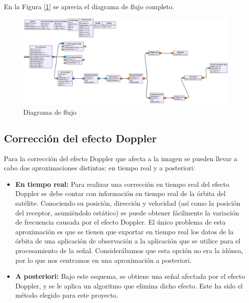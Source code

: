 \documentclass[a4paper,openright,12pt]{article}
\begin{document}
	 En la Figura [\ref{diagrama_completo}] se aprecia el diagrama de flujo completo.
	
	\begin{figure}[hbtp]
 \centering
 \includegraphics[width = 1 \linewidth]{imagenes/diagrama_flujo_completo.JPG}
 \caption{Diagrama de flujo}
 \label{diagrama_completo}
 \end{figure}

\newpage


	\subsection{Corrección del efecto Doppler}

	Para la corrección del efecto Doppler que afecta a la imagen se pueden llevar a cabo dos aproximaciones distintas: en tiempo real y a posteriori:
	
	\begin{itemize}
	
	\item \textbf{En tiempo real:} Para realizar una corrección en tiempo real del efecto Doppler se debe contar con información en tiempo real de la órbita del satélite. Conociendo su posición, dirección y velocidad (así como la posición del receptor, asumiéndolo estático) se puede obtener fácilmente la variación de frecuencia causada por el efecto Doppler. El único problema de esta aproximación es que se tienen que exportar en tiempo real los datos de la órbita de una aplicación de observación a la aplicación que se utilice para el procesamiento de la señal. Considerábamos que esta opción no era la idónea, por lo que nos centramos en una aproximación a posteriori.
	
	\item \textbf{A posteriori:} Bajo este esquema, se obtiene una señal afectada por el efecto Doppler, y se le aplica un algoritmo que elimina dicho efecto. Este ha sido el método elegido para este proyecto.
	\end{itemize}	
	
\end{document}
